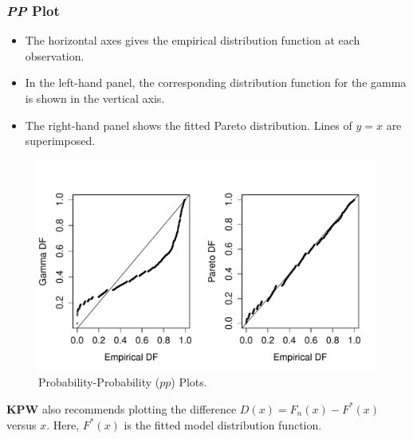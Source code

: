 \documentclass{beamer}
\begin{document}
\begin{frame}[shrink=2]
\frametitle{\textit{PP} Plot}
\begin{itemize}
\item  The horizontal axes gives the empirical distribution function at each observation.
\item In the left-hand panel, the corresponding distribution function for the gamma is shown in the vertical axis. \item  The right-hand panel shows the fitted Pareto distribution. Lines of $y=x$ are superimposed.
\end{itemize}

\vspace{-.1in}
\begin{figure}[htp]
\begin{center}
    \includegraphics[width=.6\textwidth]{Figures/PPPlot.pdf}
     \caption{\label{F:PPPlot}Probability-Probability ($pp$) Plots.}
\end{center}
\end{figure}
\textbf{KPW} also recommends plotting the difference $D(x) = F_n(x) - F^*(x)$ versus $x$. Here, $F^*(x)$ is the fitted model distribution function.
\end{frame}
\end{document}
